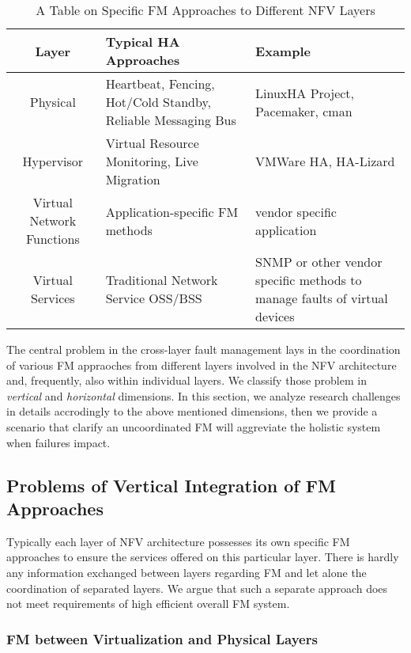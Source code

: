 \label{problemstatement}
\begin{table*}[!t]
\centering
\caption{A Table on Specific FM Approaches to Different NFV Layers}
\label{tbl:layers}
	\begin{tabular}{c|p{3cm}|p{5cm}}
		\hline
		\textbf{Layer} & \textbf{Typical HA Approaches} & \textbf{Example}\\
		\hline
		\hline
		Physical	&	Heartbeat, Fencing, Hot/Cold Standby, Reliable Messaging Bus &
LinuxHA Project, Pacemaker, cman \\
		Hypervisor & Virtual Resource Monitoring, Live Migration & VMWare HA, HA-Lizard \\
		Virtual Network Functions & Application-specific FM methods & vendor
specific application \\
		Virtual Services & Traditional Network Service OSS/BSS & SNMP or other
vendor specific methods to manage faults of virtual devices \\
\hline
	\end{tabular}
\end{table*} 
 
The central problem in the cross-layer fault management lays in the coordination
of various FM appraoches from different layers involved in the NFV architecture
and, frequently, also within individual layers. We classify those problem in
\emph{vertical} and \emph{horizontal} dimensions. In this section, we analyze
research challenges in details accrodingly to the above mentioned dimensions,
then we provide a scenario that clarify an uncoordinated FM will aggreviate the
holistic system when failures impact. 

\subsection{Problems of Vertical Integration of FM Approaches} 

Typically each layer of NFV architecture possesses its own specific FM
approaches to ensure the services offered on this particular layer. There is
hardly any information exchanged between layers regarding FM and let alone the
coordination of separated layers. We argue that such a separate approach does
not meet requirements of high efficient overall FM system.  

\subsubsection{FM between Virtualization and Physical Layers}

